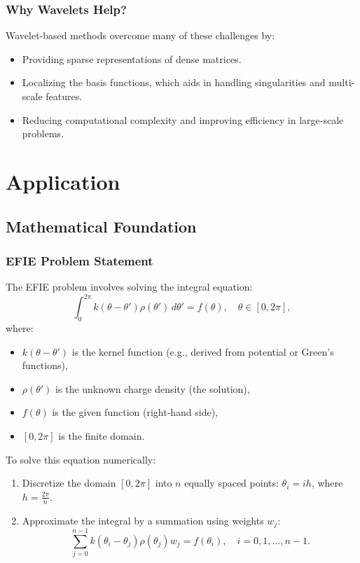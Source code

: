 \documentclass[12pt]{article}
\begin{document}
\subsubsection{Why Wavelets Help?}
Wavelet-based methods overcome many of these challenges by:
\begin{itemize}
    \item Providing sparse representations of dense matrices.
    \item Localizing the basis functions, which aids in handling singularities and multi-scale features.
    \item Reducing computational complexity and improving efficiency in large-scale problems.
\end{itemize}
\newpage

\section{Application}

\subsection{Mathematical Foundation}

\subsubsection{EFIE Problem Statement}
The EFIE problem involves solving the integral equation:
\[
    \int_0^{2\pi} k(\theta - \theta') \rho(\theta') \, d\theta' = f(\theta), \quad \theta \in [0, 2\pi],
\]
where:
\begin{itemize}
    \item \(k(\theta - \theta')\) is the kernel function (e.g., derived from potential or Green's functions),
    \item \(\rho(\theta')\) is the unknown charge density (the solution),
    \item \(f(\theta)\) is the given function (right-hand side),
    \item \([0, 2\pi]\) is the finite domain.
\end{itemize}

To solve this equation numerically:
\begin{enumerate}
    \item Discretize the domain \([0, 2\pi]\) into \(n\) equally spaced points: \(\theta_i = i h\), where \(h = \frac{2\pi}{n}\).
    \item Approximate the integral by a summation using weights \(w_j\):
          \[
              \sum_{j=0}^{n-1} k(\theta_i - \theta_j) \rho(\theta_j) w_j = f(\theta_i), \quad i = 0, 1, \dots, n-1.
          \]
\end{enumerate}
\end{document}
